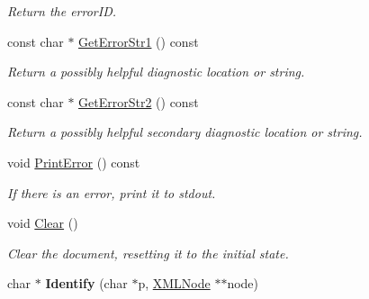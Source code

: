 \begin{DoxyCompactItemize}
\begin{DoxyCompactList}\small\item\em Return the error\+ID. \end{DoxyCompactList}\item 
const char $\ast$ \hyperlink{classtinyxml2_1_1_x_m_l_document_a016ccebecee36fe92084b5dfee6cc072}{Get\+Error\+Str1} () const \hypertarget{classtinyxml2_1_1_x_m_l_document_a016ccebecee36fe92084b5dfee6cc072}{}\label{classtinyxml2_1_1_x_m_l_document_a016ccebecee36fe92084b5dfee6cc072}

\begin{DoxyCompactList}\small\item\em Return a possibly helpful diagnostic location or string. \end{DoxyCompactList}\item 
const char $\ast$ \hyperlink{classtinyxml2_1_1_x_m_l_document_a88f6b44bd019033bda28abd31fe257b2}{Get\+Error\+Str2} () const \hypertarget{classtinyxml2_1_1_x_m_l_document_a88f6b44bd019033bda28abd31fe257b2}{}\label{classtinyxml2_1_1_x_m_l_document_a88f6b44bd019033bda28abd31fe257b2}

\begin{DoxyCompactList}\small\item\em Return a possibly helpful secondary diagnostic location or string. \end{DoxyCompactList}\item 
void \hyperlink{classtinyxml2_1_1_x_m_l_document_a7545cc9a9a67eee9307c001aa316a388}{Print\+Error} () const \hypertarget{classtinyxml2_1_1_x_m_l_document_a7545cc9a9a67eee9307c001aa316a388}{}\label{classtinyxml2_1_1_x_m_l_document_a7545cc9a9a67eee9307c001aa316a388}

\begin{DoxyCompactList}\small\item\em If there is an error, print it to stdout. \end{DoxyCompactList}\item 
void \hyperlink{classtinyxml2_1_1_x_m_l_document_a65656b0b2cbc822708eb351504178aaf}{Clear} ()\hypertarget{classtinyxml2_1_1_x_m_l_document_a65656b0b2cbc822708eb351504178aaf}{}\label{classtinyxml2_1_1_x_m_l_document_a65656b0b2cbc822708eb351504178aaf}

\begin{DoxyCompactList}\small\item\em Clear the document, resetting it to the initial state. \end{DoxyCompactList}\item 
char $\ast$ {\bfseries Identify} (char $\ast$p, \hyperlink{classtinyxml2_1_1_x_m_l_node}{X\+M\+L\+Node} $\ast$$\ast$node)\hypertarget{classtinyxml2_1_1_x_m_l_document_a25827d1bec509ad566a107e5853ed040}{}\label{classtinyxml2_1_1_x_m_l_document_a25827d1bec509ad566a107e5853ed040}


\end{DoxyCompactItemize}
